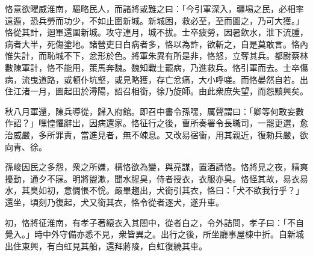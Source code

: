 \begin{pinyinscope}
 
 
 
 恪意欲曜威淮南，驅略民人，而諸將或難之曰：「今引軍深入，疆埸之民，必相率遠遁，恐兵勞而功少，不如止圍新城。新城困，救必至，至而圖之，乃可大獲。」恪從其計，迴軍還圍新城。攻守連月，城不拔。士卒疲勞，因暑飲水，泄下流腫，病者大半，死傷塗地。諸營吏日白病者多，恪以為詐，欲斬之，自是莫敢言。恪內惟失計，而恥城不下，忿形於色。將軍朱異有所是非，恪怒，立奪其兵。都尉蔡林數陳軍計，恪不能用，策馬奔魏。魏知戰士罷病，乃進救兵。恪引軍而去。士卒傷病，流曳道路，或頓仆坑壑，或見略獲，存亡忿痛，大小呼嗟。而恪晏然自若。出住江渚一月，圖起田於潯陽，詔召相銜，徐乃旋師。由此衆庶失望，而怨黷興矣。
 
 
 
 
 秋八月軍還，陳兵導從，歸入府館。即召中書令孫嘿，厲聲謂曰：「卿等何敢妄數作詔？」嘿惶懼辭出，因病還家。恪征行之後，曹所奏署令長職司，一罷更選，愈治威嚴，多所罪責，當進見者，無不竦息。又改易宿衞，用其親近，復勑兵嚴，欲向青、徐。
 
 
 
 
 孫峻因民之多怨，衆之所嫌，構恪欲為變，與亮謀，置酒請恪。恪將見之夜，精爽擾動，通夕不寐。明將盥漱，聞水腥臭，侍者授衣，衣服亦臭。恪怪其故，易衣易水，其臭如初，意惆悵不恱。嚴畢趨出，犬銜引其衣，恪曰：「犬不欲我行乎？」還坐，頃刻乃復起，犬又銜其衣，恪令從者逐犬，遂升車。
 
 
 
 
 初，恪將征淮南，有孝子著縗衣入其閤中，從者白之，令外詰問，孝子曰：「不自覺入。」時中外守備亦悉不見，衆皆異之。出行之後，所坐廳事屋棟中折。自新城出住東興，有白虹見其船，還拜蔣陵，白虹復繞其車。
 

\end{pinyinscope}
